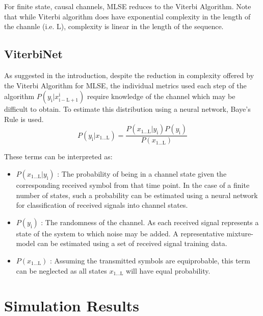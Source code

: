\documentclass[12pt,a4paper]{report}
\begin{document}
For finite state, causal channels, MLSE reduces to the Viterbi Algorithm. Note that while Viterbi algorithm does have exponential complexity in the length of the channle (i.e. L), complexity is linear in the length of the sequence. 


\subsection{ViterbiNet}
As suggested in the introduction, despite the reduction in complexity offered by the Viterbi Algorithm for MLSE, the individual metrics used each step of the algorithm 
$P(y_{\mathrm{i}}|x_{\mathrm{i-L+1}}^{\mathrm{i}}) $ require knowledge of the channel which may be difficult to obtain. To estimate this distribution using a neural network, Baye's Rule is used. 
\begin{equation}
P(y_{\mathrm{i}}|x_{\mathrm{1 ... L}}) = 
\frac
{P(x_{\mathrm{1 ... L}}|y_{\mathrm{i}})P(y_{\mathrm{i}})}
{P(x_{\mathrm{1 ... L}})}
\end{equation}

These terms can be interpreted as:

\begin{itemize}
\item $P(x_{\mathrm{1 ... L}}|y_{\mathrm{i}})$
: The probability of being in a channel state given the corresponding received symbol from that time point. In the case of a finite number of states, such a probability can be estimated using a neural network for classification of received signals into channel states. 


\item $P(y_{\mathrm{i}})$
: The randomness of the channel. As each received signal represents a state of the system to which noise may be added. A representative mixture-model can be estimated using a set of received signal training data. 


\item $P(x_{\mathrm{1 ... L}})$
: Assuming the transmitted symbols are equiprobable, this term can be neglected as all states $x_{\mathrm{1 ... L}}$ will have equal probability. 

\end{itemize}




\section{Simulation Results}
\end{document}
